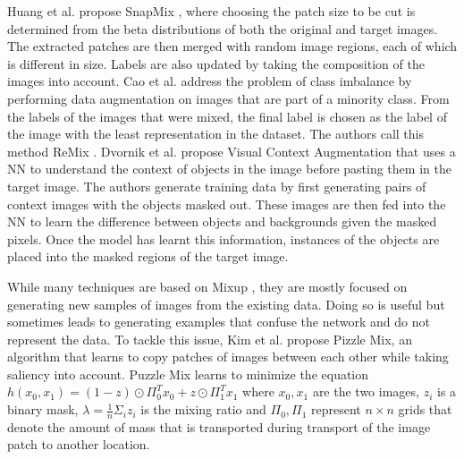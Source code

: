 Huang et al. propose SnapMix \cite{huangSnapMixSemanticallyProportional2021}, where choosing the patch size to be cut is determined from the beta distributions of both the original and target images. The extracted patches are then merged with random image regions, each of which is different in size. Labels are also updated by taking the composition of the images into account.
Cao et al. address the problem of class imbalance by performing data augmentation on images that are part of a minority class. From the labels of the images that were mixed, the final label is chosen as the label of the image with the least representation in the dataset. The authors call this method ReMix \cite{caoReMixImagetoImageTranslation2021}.
Dvornik et al. propose Visual Context Augmentation \cite{dvornikModelingVisualContext2018} that uses a NN to understand the context of objects in the image before pasting them in the target image. The authors generate training data by first generating pairs of context images with the objects masked out. These images are then fed into the NN to learn the difference between objects and backgrounds given the masked pixels. Once the model has learnt this information, instances of the objects are placed into the masked regions of the target image.

While many techniques are based on Mixup \cite{zhangMixupEmpiricalRisk2018}, they are mostly focused on generating new samples of images from the existing data. Doing so is useful but sometimes leads to generating examples that confuse the network and do not represent the data. To tackle this issue, Kim et al. \cite{kimPuzzleMixExploiting2020} propose Pizzle Mix, an algorithm that learns to copy patches of images between each other while taking saliency into account. Puzzle Mix learns to minimize the equation $h(x_{0}, x_{1}) = (1-z) \odot \Pi_{0}^{T}x_{0} + z \odot \Pi_{1}^{T}x_{1}$ where $x_{0}, x_{1}$ are the two images, $z_{i}$ is a binary mask, $\lambda = \frac{1}{n}\Sigma_{i}z_{i}$ is the mixing ratio and $\Pi_{0}, \Pi_{1}$ represent $n \times n$ grids that denote the amount of mass that is transported during transport of the image patch to another location. 

